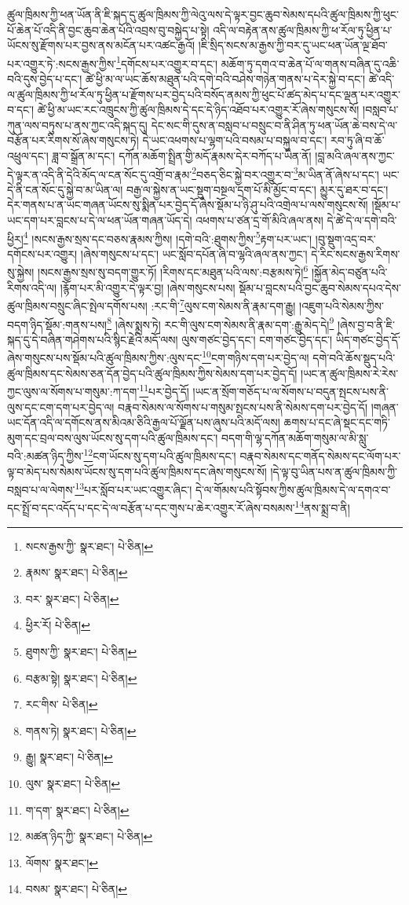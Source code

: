 ཚུལ་ཁྲིམས་ཀྱི་ཕན་ཡོན་ནི་ཇི་སྐད་དུ་ཚུལ་ཁྲིམས་ཀྱི་ལེའུ་ལས་དེ་ལྟར་བྱང་ཆུབ་སེམས་དཔའི་ཚུལ་ཁྲིམས་ཀྱི་ཕུང་པོ་ཆེན་པོ་འདི་ནི་བྱང་ཆུབ་ཆེན་པོའི་འབྲས་བུ་བསྐྱེད་པ་སྟེ། འདི་ལ་བརྟེན་ནས་ཚུལ་ཁྲིམས་ཀྱི་ཕ་རོལ་ཏུ་ཕྱིན་པ་ཡོངས་སུ་རྫོགས་པར་བྱས་ནས་མངོན་པར་འཚང་རྒྱའོ། །ཇི་སྲིད་སངས་མ་རྒྱས་ཀྱི་བར་དུ་ཡང་ཕན་ཡོན་ལྔ་ཐོབ་པར་འགྱུར་ཏེ་:སངས་རྒྱས་ཀྱིས་\footnote{སངས་རྒྱས་ཀྱི་  སྣར་ཐང་།  པེ་ཅིན། }དགོངས་པར་འགྱུར་བ་དང་། མཆོག་ཏུ་དགའ་བ་ཆེན་པོ་ལ་གནས་བཞིན་དུ་འཆི་བའི་དུས་བྱེད་པ་དང་། ཚེ་ཕྱི་མ་ལ་ཡང་ཆོས་མཐུན་པའི་དགེ་བའི་བཤེས་གཉེན་གནས་པ་དེར་སྐྱེ་བ་དང་། ཚེ་འདི་ལ་ཚུལ་ཁྲིམས་ཀྱི་ཕ་རོལ་ཏུ་ཕྱིན་པ་རྫོགས་པར་བྱེད་པའི་བསོད་ནམས་ཀྱི་ཕུང་པོ་ཚད་མེད་པ་དང་ལྡན་པར་འགྱུར་བ་དང་། ཚེ་ཕྱི་མ་ཡང་རང་འཁྲུངས་ཀྱི་ཚུལ་ཁྲིམས་དེ་དང་དེ་ཉིད་འཐོབ་པར་འགྱུར་རོ་ཞེས་གསུངས་སོ། །བསླབ་པ་ཀུན་ལས་བཏུས་པ་ནས་ཀྱང་འདི་སྐད་དུ། དེང་སང་གི་དུས་ན་བསླབ་པ་བསྲུང་བ་ནི་ཤིན་ཏུ་ཕན་ཡོན་ཆེ་བས་དེ་ལ་བརྩོན་པར་རིགས་སོ་ཞེས་གསུངས་ཏེ། དེ་ཡང་འཕགས་པ་ལྷག་པའི་བསམ་པ་བསྐུལ་བ་དང་། རབ་ཏུ་ཞི་བ་ཆོ་འཕྲུལ་དང་། ཟླ་བ་སྒྲོན་མ་དང་། དཀོན་མཆོག་སྤྲིན་གྱི་མདོ་རྣམས་དེར་བཀོད་པ་ཡིན་ནོ། །བླ་མའི་ཞལ་ནས་ཀྱང་དེ་ལྟར་ན་འདི་ནི་དེའི་མོད་ལ་ངན་སོང་དུ་འགྲོ་བ་རྣམ་\footnote{རྣམས་  སྣར་ཐང་།  པེ་ཅིན། }བཅད་ཅིང་སྐྱེ་བར་འགྱུར་བ་\footnote{བར་  སྣར་ཐང་།  པེ་ཅིན། }མ་ཡིན་ནོ་ཞེས་པ་དང་། ཡང་དེ་ནི་ངན་སོང་དུ་སྐྱེ་བ་མ་ཡིན་ལ། བརྒྱ་ལ་སྐྱེས་ན་ཡང་སྡུག་བསྔལ་དྲག་པོ་མི་མྱོང་བ་དང་། མྱུར་དུ་ཐར་བ་དང་། དེར་གནས་པ་ན་ཡང་གཞན་ཡོངས་སུ་སྨིན་པར་བྱེད་དོ་ཞེས་སྡོམ་པ་ཉི་ཤུ་པའི་འགྲེལ་པ་ལས་གསུངས་སོ། །སྡོམ་པ་ཡང་དག་པར་བླངས་པ་དེ་ལ་ཕན་ཡོན་གཞན་ཡོད་དེ། འཕགས་པ་ཙན་དྲ་གོ་མིའི་ཞལ་ནས། དེ་ཚེ་དེ་ལ་དགེ་བའི་ཕྱིར།\footnote{ཕྱིར་རོ།  པེ་ཅིན། } །སངས་རྒྱས་སྲས་དང་བཅས་རྣམས་ཀྱིས། །དགེ་བའི་:ཐུགས་ཀྱིས་\footnote{ཐུགས་ཀྱི་  སྣར་ཐང་།  པེ་ཅིན། }རྟག་པར་ཡང་། །བུ་སྡུག་འདྲ་བར་དགོངས་པར་འགྱུར། །ཞེས་གསུངས་པ་དང་། ཡང་སློབ་དཔོན་ཞི་བ་ལྷའི་ཞལ་ནས་ཀྱང་། དེ་རིང་སངས་རྒྱས་རིགས་སུ་སྐྱེས། །སངས་རྒྱས་སྲས་སུ་བདག་གྱུར་ཏོ། །རིགས་དང་མཐུན་པའི་ལས་:བརྩམས་ཏེ།\footnote{བརྩམ་སྟེ།  སྣར་ཐང་།  པེ་ཅིན། } །སྐྱོན་མེད་བཙུན་པའི་རིགས་འདི་ལ། །རྙོག་པར་མི་འགྱུར་དེ་ལྟར་བྱ། །ཞེས་གསུངས་པས། སྡོམ་པ་བླངས་པའི་བྱང་ཆུབ་སེམས་དཔའ་དེས་ཚུལ་ཁྲིམས་བསྲུང་ཞིང་སྤེལ་དགོས་པས། :རང་གི་\footnote{རང་གིས་  པེ་ཅིན། }ལུས་ངག་སེམས་ནི་རྣམ་དག་རྒྱུ། །འཇུག་པའི་སེམས་ཀྱིས་བདག་ཉིད་སྡོམ་:གནས་པས།\footnote{གནས་ཏེ།  སྣར་ཐང་།  པེ་ཅིན། } །ཞེས་སྨྲས་ཏེ། རང་གི་ལུས་ངག་སེམས་ནི་རྣམ་དག་:རྒྱུ་མེད་དེ།\footnote{རྒྱུ།  སྣར་ཐང་།  པེ་ཅིན། } །ཞེས་བྱ་བ་ནི་ཇི་སྐད་དུ་དེ་བཞིན་གཤེགས་པའི་སྙིང་རྗེའི་མདོ་ལས། ལུས་གཙང་བྱེད་དང་། ངག་གཙང་བྱེད་དང་། ཡིད་གཙང་བྱེད་དོ་ཞེས་གསུངས་པས་སྡོམ་པའི་ཚུལ་ཁྲིམས་ཀྱིས་:ལུས་དང་\footnote{ལུས་  སྣར་ཐང་།  པེ་ཅིན། }ངག་གཉིས་དག་པར་བྱེད་ལ། དགེ་བའི་ཆོས་སྡུད་པའི་ཚུལ་ཁྲིམས་དང་སེམས་ཅན་དོན་བྱེད་པའི་ཚུལ་ཁྲིམས་ཀྱིས་སེམས་དག་པར་བྱེད་དོ། །ཡང་ན་ཚུལ་ཁྲིམས་རེ་རེས་ཀྱང་ལུས་ལ་སོགས་པ་གསུམ་:ཀ་དག་\footnote{ག་དག་  སྣར་ཐང་།  པེ་ཅིན། }པར་བྱེད་དོ། །ཡང་ན་སྲོག་གཅོད་པ་ལ་སོགས་པ་བདུན་སྤངས་པས་ནི་ལུས་དང་ངག་དག་པར་བྱེད་ལ། བརྣབ་སེམས་ལ་སོགས་པ་གསུམ་སྤངས་པས་ནི་སེམས་དག་པར་བྱེད་དོ། །གཞན་ཡང་དོན་འདི་ལ་དགོངས་ནས་མིའམ་ཅིའི་རྒྱལ་པོ་ལྗོན་པས་ཞུས་པའི་མདོ་ལས། ཆགས་པ་དང་ཞེ་སྡང་དང་གཏི་མུག་དང་བྲལ་བས་ལུས་ཡོངས་སུ་དག་པའི་ཚུལ་ཁྲིམས་དང་། བདག་གི་ལྷ་དཀོན་མཆོག་གསུམ་ལ་མི་སླུ་བའི་:མཚན་ཉིད་ཀྱིས་\footnote{མཚན་ཉིད་ཀྱི་  སྣར་ཐང་།  པེ་ཅིན། }ངག་ཡོངས་སུ་དག་པའི་ཚུལ་ཁྲིམས་དང་། བརྣབ་སེམས་དང་གནོད་སེམས་དང་ལོག་པར་ལྟ་བ་མེད་པས་སེམས་ཡོངས་སུ་དག་པའི་ཚུལ་ཁྲིམས་དང་ཞེས་གསུངས་སོ། །དེ་ལྟ་བུ་ཡིན་པས་ན་ཚུལ་ཁྲིམས་ཀྱི་བསླབ་པ་ལ་ལེགས་\footnote{ལོགས་  སྣར་ཐང་། }པར་སློབ་པར་ཡང་འགྱུར་ཞིང་། དེ་ལ་གོམས་པའི་སྟོབས་ཀྱིས་ཚུལ་ཁྲིམས་དེ་ལ་དགའ་བ་དང་སྤྲོ་བ་དང་འདོད་པ་དང་དེ་ལ་བརྩོན་པ་དང་གུས་པ་ཆེར་འགྱུར་རོ་ཞེས་བསམས་\footnote{བསམ་  སྣར་ཐང་།  པེ་ཅིན། }ནས་སྨྲ་བ་ནི། 